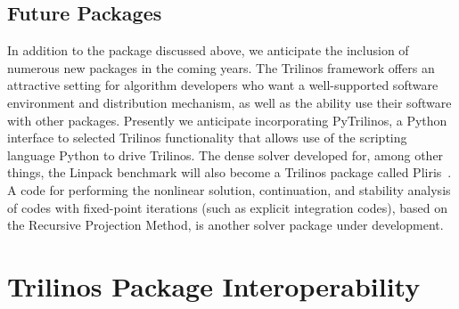 \documentclass[12pt,relax]{TPA}
\begin{document}
\subsection{Future Packages}

In addition to the package discussed above, we anticipate the
inclusion of numerous new packages in the coming years.
The Trilinos framework offers an attractive setting for algorithm
developers who want a well-supported software environment and
distribution mechanism, as well as the ability use their software with
other packages.  Presently we anticipate incorporating PyTrilinos, a
Python interface to selected Trilinos functionality that allows use of
the scripting language Python to drive Trilinos.  
The dense solver developed for, among other things, the Linpack
benchmark will also become a Trilinos package called 
Pliris~\cite{Pliris-home-page}. A code for
performing the nonlinear solution, continuation, and stability 
analysis of codes with fixed-point iterations (such as explicit
integration codes), based on the Recursive Projection Method, is
another solver package under development.

\section{Trilinos Package Interoperability}
\label{sect:Interoperability}
\end{document}
